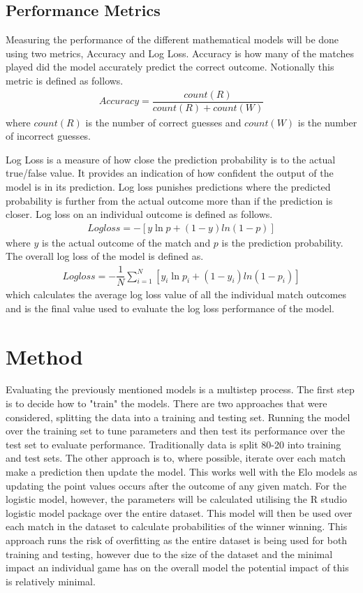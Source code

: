 \documentclass[12pt,a4paper]{article}
\begin{document}
\subsection{Performance Metrics}
Measuring the performance of the different mathematical models will be done using
two metrics, Accuracy and Log Loss. Accuracy is how many of the matches played
did the model accurately predict the correct outcome. Notionally this metric is
defined as follows.
\begin{gather}
  Accuracy = \dfrac{count(R)}{count(R)+count(W)}
\end{gather}
where $count(R)$ is the number of correct guesses and $count(W)$ is the number
of incorrect guesses.

Log Loss is a measure of how close the prediction probability is to the actual
true/false value. It provides an indication of how confident the output of the
model is in its prediction. Log loss punishes predictions where the predicted
probability is further from the actual outcome more than if the prediction is
closer. Log loss on an individual outcome is defined as follows.
\begin{gather}
  Logloss = -[y \ln p +(1-y)ln(1-p)]
\end{gather}
where $y$ is the actual outcome of the match and $p$ is the prediction probability.
The overall log loss of the model is defined as.
\begin{gather}
  Logloss = -\dfrac{1}{N}\sum_{i=1}^{N}[y_i \ln p_i +(1-y_i)ln(1-p_i)]
\end{gather}
which calculates the average log loss value of all the individual match outcomes
and is the final value used to evaluate the log loss performance of the model.
\clearpage

\section{Method}
Evaluating the previously mentioned models is a multistep process. The first
step is to decide how to "train" the models. There are two approaches that were
considered, splitting the data into a training and testing set. Running the
model over the training set to tune parameters and then test its performance over
the test set to evaluate performance. Traditionally data is split 80-20 into
training and test sets.
The other approach is to, where possible, iterate over each match make a
prediction then update the model. This works well with the Elo models as
updating the point values occurs after the outcome of any given match. For
the logistic model, however, the parameters will be calculated utilising the R studio
logistic model package over the entire dataset. This model will then be used over each
match in the dataset to calculate probabilities of the winner winning. This
approach runs the risk of overfitting as the entire dataset is being used for
both training and testing, however due to the size of the dataset and the minimal
impact an individual game has on the overall model the potential impact of this is
relatively minimal.
\end{document}
